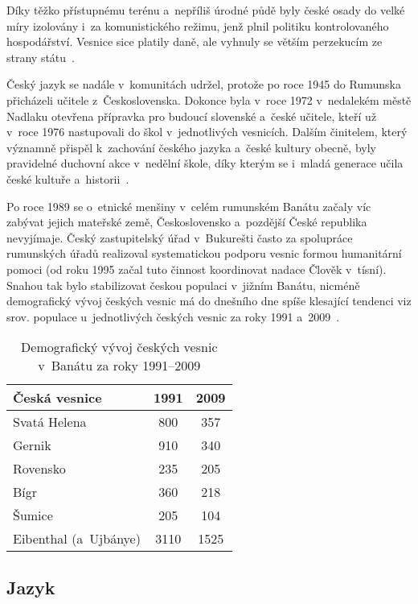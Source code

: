 Díky těžko přístupnému terénu a~nepříliš úrodné půdě byly české osady do velké míry izolovány i~za komunistického režimu, jenž plnil politiku kontrolovaného hospodářství. Vesnice sice platily daně, ale vyhnuly se větším perzekucím ze strany státu~\parencite{Frnochova2012}.

Český jazyk se nadále v~komunitách udržel, protože po roce 1945 do Rumunska přicházeli učitele z~Československa. Dokonce byla v~roce 1972 v~nedalekém městě Nadlaku otevřena přípravka pro budoucí slovenské a~české učitele, kteří už v~roce 1976 nastupovali do škol v~jednotlivých vesnicích. Dalším činitelem, který významně přispěl k~zachování českého jazyka a~české kultury obecně, byly pravidelné duchovní akce v~nedělní škole, díky kterým se i~mladá generace učila české kultuře a~historii~\parencite{Vaculik2009b}.

Po roce 1989 se o~etnické menšiny v~celém rumunském Banátu začaly víc zabývat jejich mateřské země, Československo a~pozdější České republika nevyjímaje. Český zastupitelský úřad v~Bukurešti často za spolupráce rumunských úřadů realizoval systematickou podporu vesnic formou humanitární pomoci (od roku 1995 začal tuto činnost koordinovat nadace Člověk v~tísní). Snahou tak bylo stabilizovat českou populaci v~jižním Banátu, nicméně demografický vývoj českých vesnic má do dnešního dne spíše klesající tendenci viz srov. populace u~jednotlivých českých vesnic za roky 1991 a~2009~\parencite{Gecse2013}.

\begin{table}[h!]
\centering
\begin{tabular}{||l c c||} 
 \hline
  Česká vesnice & 1991 & 2009 \\ [0.5ex] 
 \hline\hline
 Svatá Helena & 800 & 357 \\ 
 \hline
 Gernik & 910 & 340 \\
 \hline
 Rovensko & 235 & 205 \\
 \hline
 Bígr & 360 & 218 \\
 \hline
 Šumice & 205 & 104  \\ [1ex] 
 \hline
  Eibenthal (a~Ujbánye) & 3110 & 1525 \\ [1ex] 
 \hline
\end{tabular}
\caption*{Demografický vývoj českých vesnic v~Banátu za roky 1991–2009}
\label{table:1}
\end{table}

\hypertarget{jazyk}{%
\subsection*{Jazyk}\label{jazyk}}

